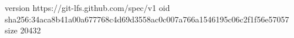 version https://git-lfs.github.com/spec/v1
oid sha256:34aca8b41a00a677768c4d69d3558ac0c007a766a1546195c06c2f1f56e57057
size 20432
